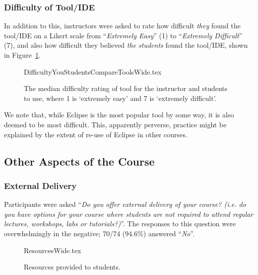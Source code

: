 \documentclass[a4paper,11pt]{article}
\begin{document}
\subsubsection{Difficulty of Tool/IDE}

In addition to this, instructors were asked to rate how difficult
{\emph{they}} found the tool/IDE on a Likert scale from
``{\emph{Extremely Easy}}'' (1) to ``{\emph{Extremely Difficult}}''
(7), and also how difficult they believed {\emph{the students}} found
the tool/IDE, shown in Figure~\ref{fig:toolhard}.

\begin{figure}
\begin{center}
{DifficultyYouStudentsCompareToolsWide.tex}
\end{center}
\caption{The median difficulty rating of tool for the instructor and students to use, where 1 is `extremely easy' and 7 is `extremely difficult'.  %
\label{fig:toolhard}}
\end{figure}

We note that, while Eclipse is the most popular tool by some way, it
is also deemed to be most difficult. This, apparently perverse,
practice might be explained by the extent of re-use of Eclipse in
other courses.



\subsection{Other Aspects of the Course}

\subsubsection{External Delivery}

Participants were asked ``{\emph{Do you offer external delivery of your course? (i.e. do you have options for your course where students are not required to attend regular lectures, workshops, labs or tutorials?)}}''. The responses to this question were overwhelmingly in the negative; 70/74 (94.6\%) answered ``{\emph{No}}''.

\begin{figure}[th]
\begin{center}
{ResourcesWide.tex}
\end{center}\vskip-18pt
\caption{Resources provided to students.\label{fig:Resources}}
\end{figure}
\end{document}
